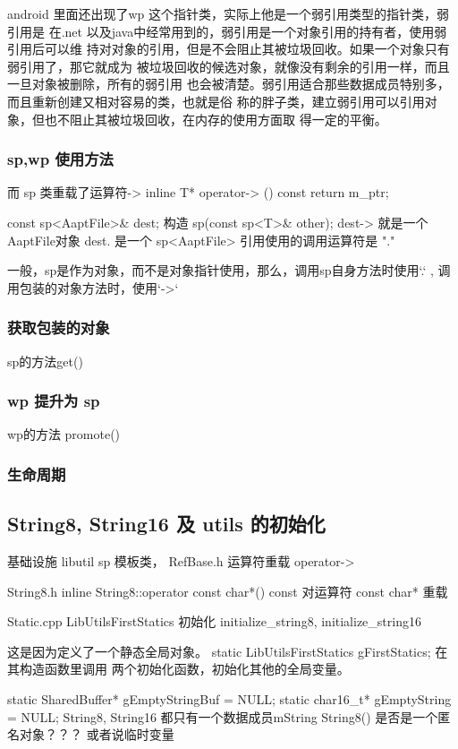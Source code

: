 \documentclass[a4paper,11pt]{article}
\begin{document}
android 里面还出现了wp 这个指针类，实际上他是一个弱引用类型的指针类，弱引用是
在.net 以及java中经常用到的，弱引用是一个对象引用的持有者，使用弱引用后可以维
持对对象的引用，但是不会阻止其被垃圾回收。如果一个对象只有弱引用了，那它就成为
被垃圾回收的候选对象，就像没有剩余的引用一样，而且一旦对象被删除，所有的弱引用
也会被清楚。弱引用适合那些数据成员特别多，而且重新创建又相对容易的类，也就是俗
称的胖子类，建立弱引用可以引用对象，但也不阻止其被垃圾回收，在内存的使用方面取
得一定的平衡。

\subsubsection{sp,wp 使用方法}
而 sp 类重载了运算符->
    inline  T*      operator-> () const { return m_ptr;  }

const sp<AaptFile>\& dest;  构造   sp(const sp<T>\& other);
dest-> 就是一个AaptFile对象
dest.  是一个 sp<AaptFile>
引用使用的调用运算符是 "."

一般，sp是作为对象，而不是对象指针使用，那么，调用sp自身方法时使用`.` ,
调用包装的对象方法时，使用`->`

\subsubsection{获取包装的对象}
sp的方法get()

\subsubsection{wp 提升为 sp}
wp的方法 promote()
\subsubsection{生命周期}


\subsection{ String8, String16 及 utils 的初始化 }
基础设施 libutil
sp 模板类， RefBase.h    运算符重载 operator->

String8.h
inline String8::operator const char*() const
对运算符 const char* 重载

Static.cpp  LibUtilsFirstStatics   初始化 initialize_string8,
initialize_string16

这是因为定义了一个静态全局对象。
static LibUtilsFirstStatics gFirstStatics;
在其构造函数里调用 两个初始化函数，初始化其他的全局变量。

static SharedBuffer* gEmptyStringBuf = NULL;
static char16_t* gEmptyString = NULL;
String8, String16 都只有一个数据成员mString
String8() 是否是一个匿名对象？？？  或者说临时变量
\end{document}
